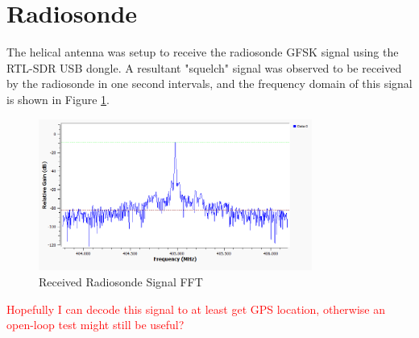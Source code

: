 \graphicspath{{./figures}}

\section{Radiosonde}

The helical antenna was setup to receive the radiosonde GFSK signal using the RTL-SDR USB dongle. A resultant "squelch" signal was observed to be received by the radiosonde in one second intervals, and the frequency domain of this signal is shown in Figure \ref{fig:radiosondeSpectrum}.

\begin{figure}[!htb]
  \centering
  \includegraphics[width=0.8\textwidth]{radiosondeSpectrum}
  \caption{Received Radiosonde Signal FFT}
  \label{fig:radiosondeSpectrum}
\end{figure}

\textcolor{red}{Hopefully I can decode this signal to at least get GPS location, otherwise an open-loop test might still be useful?}